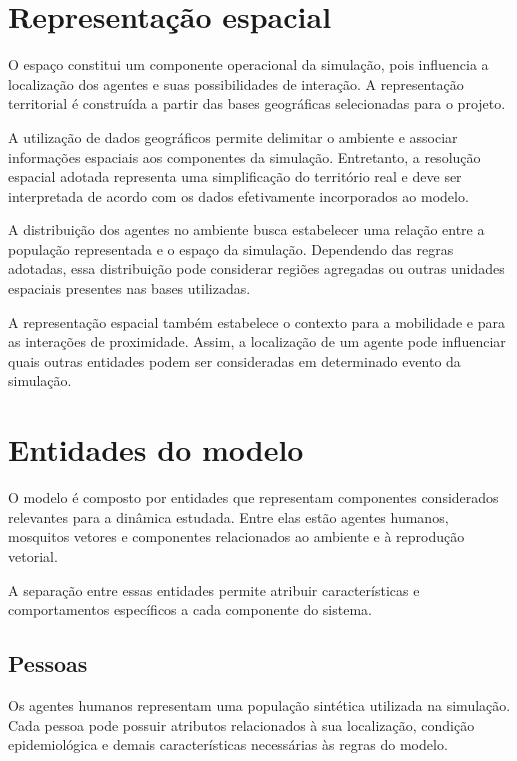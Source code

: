 \section{Representação espacial}

O espaço constitui um componente operacional da simulação, pois influencia a localização dos agentes e suas possibilidades de interação. A representação territorial é construída a partir das bases geográficas selecionadas para o projeto.

A utilização de dados geográficos permite delimitar o ambiente e associar informações espaciais aos componentes da simulação. Entretanto, a resolução espacial adotada representa uma simplificação do território real e deve ser interpretada de acordo com os dados efetivamente incorporados ao modelo.

A distribuição dos agentes no ambiente busca estabelecer uma relação entre a população representada e o espaço da simulação. Dependendo das regras adotadas, essa distribuição pode considerar regiões agregadas ou outras unidades espaciais presentes nas bases utilizadas.

A representação espacial também estabelece o contexto para a mobilidade e para as interações de proximidade. Assim, a localização de um agente pode influenciar quais outras entidades podem ser consideradas em determinado evento da simulação.

\section{Entidades do modelo}

O modelo é composto por entidades que representam componentes considerados relevantes para a dinâmica estudada. Entre elas estão agentes humanos, mosquitos vetores e componentes relacionados ao ambiente e à reprodução vetorial.

A separação entre essas entidades permite atribuir características e comportamentos específicos a cada componente do sistema.

\subsection{Pessoas}

Os agentes humanos representam uma população sintética utilizada na simulação. Cada pessoa pode possuir atributos relacionados à sua localização, condição epidemiológica e demais características necessárias às regras do modelo.

